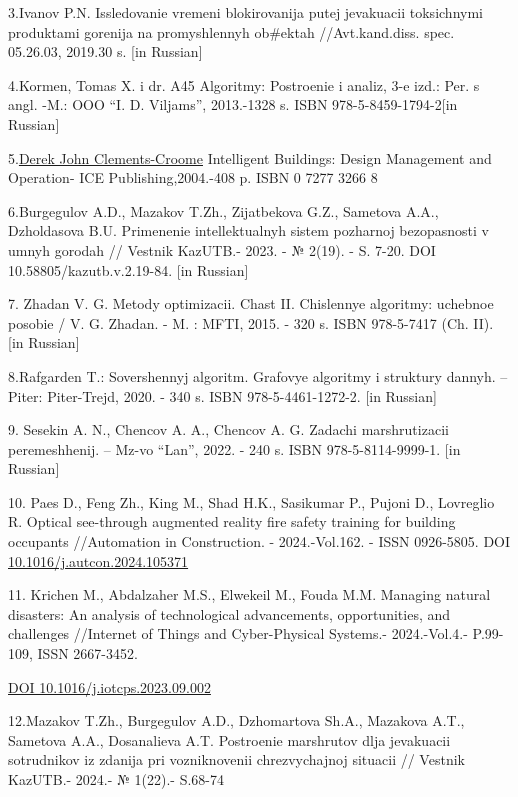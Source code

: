 \documentclass[
]{article}
\begin{document}
3.Ivanov P.N. Issledovanie vremeni blokirovanija putej jevakuacii
toksichnymi produktami gorenija na promyshlennyh ob\#ektah
//Avt.kand.diss. spec. 05.26.03, 2019.30 s. {[}in Russian{]}

4.Kormen, Tomas X. i dr. A45 Algoritmy: Postroenie i analiz, 3-e izd.:
Per. s angl. -M.: OOO ``I. D. Vil\textquotesingle jams'', 2013.-1328 s.
ISBN 978-5-8459-1794-2{[}in Russian{]}

5.\href{https://www.researchgate.net/profile/Derek-Clements-Croome}{Derek
John Clements-Croome} Intelligent Buildings: Design Management and
Operation- ICE Publishing,2004.-408 p. ISBN 0 7277 3266 8

6.Burgegulov A.D., Mazakov T.Zh., Zijatbekova G.Z., Sametova A.A.,
Dzholdasova B.U. Primenenie intellektual\textquotesingle nyh sistem
pozharnoj bezopasnosti v umnyh gorodah // Vestnik KazUTB.- 2023. - №
2(19). - S. 7-20. DOI 10.58805/kazutb.v.2.19-84. {[}in Russian{]}

7. Zhadan V. G. Metody optimizacii. Chast\textquotesingle{} II.
Chislennye algoritmy: uchebnoe posobie / V. G. Zhadan. - M. : MFTI,
2015. - 320 s. ISBN 978-5-7417 (Ch. II). {[}in Russian{]}

8.Rafgarden T.: Sovershennyj algoritm. Grafovye algoritmy i struktury
dannyh. -- Piter: Piter-Trejd, 2020. - 340 s. ISBN 978-5-4461-1272-2.
{[}in Russian{]}

9. Sesekin A. N., Chencov A. A., Chencov A. G. Zadachi marshrutizacii
peremeshhenij. -- Mz-vo ``Lan\textquotesingle'', 2022. - 240 s. ISBN
978-5-8114-9999-1. {[}in Russian{]}

10. Paes D., Feng Zh., King M., Shad H.K., Sasikumar P., Pujoni D.,
Lovreglio R. Optical see-through augmented reality fire safety training
for building occupants //Automation in Construction. - 2024.-Vol.162. -
ISSN 0926-5805. DOI
\href{https://doi.org/10.1016/j.autcon.2024.105371}{10.1016/j.autcon.2024.105371}

11. Krichen M., Abdalzaher M.S., Elwekeil M., Fouda M.M. Managing
natural disasters: An analysis of technological advancements,
opportunities, and challenges //Internet of Things and Cyber-Physical
Systems.- 2024.-Vol.4.- P.99-109, ISSN 2667-3452.

\href{https://doi.org/10.1016/j.iotcps.2023.09.002}{DOI
10.1016/j.iotcps.2023.09.002}

12.Mazakov T.Zh., Burgegulov A.D., Dzhomartova Sh.A., Mazakova A.T.,
Sametova A.A., Dosanalieva A.T. Postroenie marshrutov dlja jevakuacii
sotrudnikov iz zdanija pri vozniknovenii chrezvychajnoj situacii //
Vestnik KazUTB.- 2024.- № 1(22).- S.68-74
\end{document}
